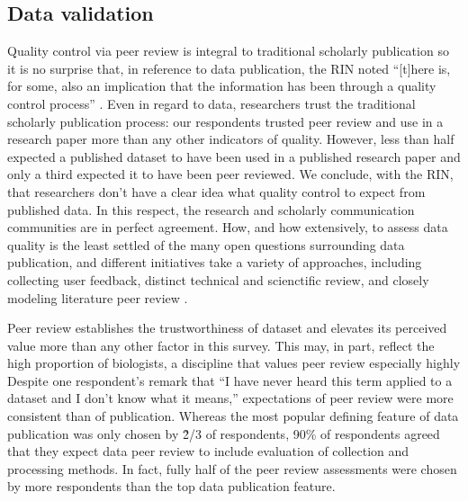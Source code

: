 \documentclass[10pt]{article}
\begin{document}
\subsection*{Data validation}

Quality control via peer review is integral to traditional scholarly publication so it is no surprise that, in reference to data publication, the RIN noted ``[t]here is, for some, also an implication that the information has been through a quality control process'' \cite{swan_share_2008}.
Even in regard to data, researchers trust the traditional scholarly publication process: our respondents trusted peer review and use in a research paper more than any other indicators of quality.
However, less than half expected a published dataset to have been used in a published research paper and only a third expected it to have been peer reviewed.
We conclude, with the RIN, that researchers don't have a clear idea what quality control to expect from published data.
In this respect, the research and scholarly communication communities are in perfect agreement.
How, and how extensively, to assess data quality is the least settled of the many open questions surrounding data publication, and different initiatives take a variety of approaches, including collecting user feedback, distinct technical and scienctific review, and closely modeling literature peer review \cite{kratz_data_2014}.

Peer review establishes the trustworthiness of dataset and elevates its perceived value more than any other factor in this survey.
This may, in part, reflect the high proportion of biologists, a discipline that values peer review especially highly \cite{harley_assessing_2010} %
Despite one respondent's remark that ``I have never heard this term applied to a dataset and I don't know what it means,'' expectations of peer review were more consistent than of publication. 
Whereas the most popular defining feature of data publication was only chosen by \~2/3 of respondents, 90\% of respondents agreed that they expect data peer review to include evaluation of collection and processing methods.
In fact, fully half of the peer review assessments were chosen by more respondents than the top data publication feature.
\end{document}
